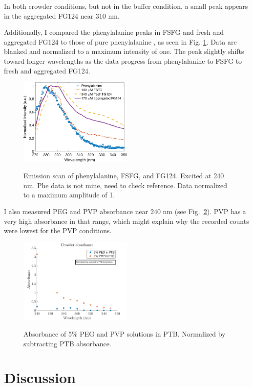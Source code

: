 In both crowder conditions, but not in the buffer condition, a small peak appears in the aggregated FG124 near 310 nm.

Additionally, I compared the phenylalanine peaks in FSFG and fresh and aggregated FG124 to those of pure phenylalanine \cite{zotero-5177}, as seen in Fig. \ref{fig:phe-comparison}.  Data are blanked and normalized to a maximum intensity of one.  The peak slightly shifts toward longer wavelengths as the data progress from phenylalanine to FSFG to fresh and aggregated FG124.
\begin{figure}
\caption{Emission scan of phenylalanine, FSFG, and FG124. Excited at 240 nm.  Phe data is not mine, need to check reference. Data normalized to a maximum amplitude of 1.}
\centering
\includegraphics[width=0.5\textwidth]{figs/ch05/phe-comparison}
\label{fig:phe-comparison}
\end{figure}
I also measured PEG and PVP absorbance near 240 nm (see Fig.~\ref{fig:crowder-absorbance}).  PVP has a very high absorbance in that range, which might explain why the recorded counts were lowest for the PVP conditions.
\begin{figure}
\caption{Absorbance of 5\% PEG and PVP solutions in PTB.  Normalized by subtracting PTB absorbance.}
\centering
\includegraphics[width=0.5\textwidth]{figs/ch05/crowder-absorbance}
\label{fig:crowder-absorbance}
\end{figure}

\section{Discussion}

